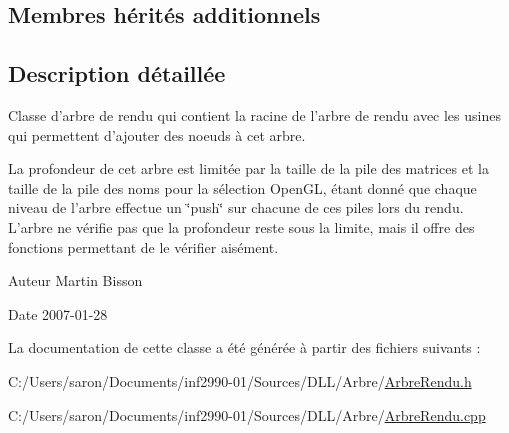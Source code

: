 \subsection*{Membres hérités additionnels}


\subsection{Description détaillée}
Classe d'arbre de rendu qui contient la racine de l'arbre de rendu avec les usines qui permettent d'ajouter des noeuds à cet arbre. 

La profondeur de cet arbre est limitée par la taille de la pile des matrices et la taille de la pile des noms pour la sélection Open\-G\-L, étant donné que chaque niveau de l'arbre effectue un \char`\"{}push\char`\"{} sur chacune de ces piles lors du rendu. L'arbre ne vérifie pas que la profondeur reste sous la limite, mais il offre des fonctions permettant de le vérifier aisément.

\begin{DoxyAuthor}{Auteur}
Martin Bisson 
\end{DoxyAuthor}
\begin{DoxyDate}{Date}
2007-\/01-\/28 
\end{DoxyDate}


La documentation de cette classe a été générée à partir des fichiers suivants \-:\begin{DoxyCompactItemize}
\item 
C\-:/\-Users/saron/\-Documents/inf2990-\/01/\-Sources/\-D\-L\-L/\-Arbre/\hyperlink{_arbre_rendu_8h}{Arbre\-Rendu.\-h}\item 
C\-:/\-Users/saron/\-Documents/inf2990-\/01/\-Sources/\-D\-L\-L/\-Arbre/\hyperlink{_arbre_rendu_8cpp}{Arbre\-Rendu.\-cpp}\end{DoxyCompactItemize}
